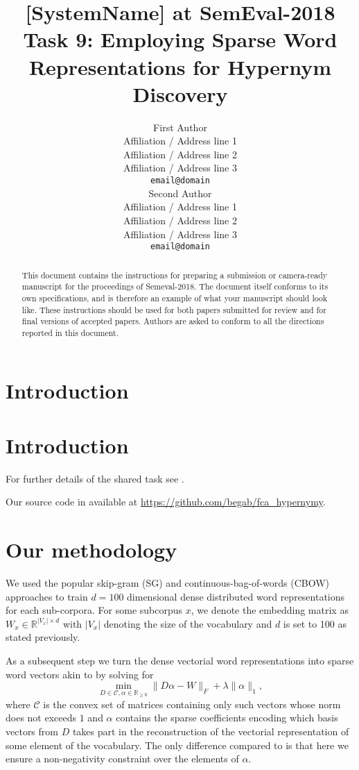 \documentclass[11pt,a4paper]{article}
\title{[SystemName] at SemEval-2018 Task 9: Employing Sparse Word Representations for Hypernym Discovery}
\author{First Author \\
  Affiliation / Address line 1 \\
  Affiliation / Address line 2 \\
  Affiliation / Address line 3 \\
  {\tt email@domain} \\\And
  Second Author \\
  Affiliation / Address line 1 \\
  Affiliation / Address line 2 \\
  Affiliation / Address line 3 \\
  {\tt email@domain} \\}
\date{}
\begin{document}
\maketitle
\begin{abstract}
  This document contains the instructions for preparing a submission or camera-ready
  manuscript for the proceedings of Semeval-2018. The document itself
  conforms to its own specifications, and is therefore an example of
  what your manuscript should look like. These instructions should be
  used for both papers submitted for review and for final versions of
  accepted papers.  Authors are asked to conform to all the directions
  reported in this document.
\end{abstract}

\section{Introduction}



\section{Introduction}


For further details of the shared task see
\cite{semeval2018task9}.

Our source code in available at \url{https://github.com/begab/fca_hypernymy}.


\section{Our methodology}
We used the popular skip-gram (SG) and continuous-bag-of-words (CBOW) approaches \cite{DBLP:journals/corr/abs-1301-3781} to train $d=100$ dimensional dense distributed word representations for each sub-corpora. For some subcorpus $x$, we denote the embedding matrix as $W_x \in \mathbb{R}^{\lvert V_x \rvert \times d}$ with $\lvert V_x \rvert$ denoting the size of the vocabulary and $d$ is set to 100 as stated previously.

As a subsequent step we turn the dense vectorial word representations into sparse word vectors akin to \citet{TACL1063} by solving for
\begin{equation}
\min\limits_{D \in \mathcal{C}, \alpha \in \mathbb{R}_{\geq0}} \lVert D\alpha - W \rVert_F + \lambda \lVert \alpha \rVert_1,
\label{nonneg_SPAMS_objective}
\end{equation}
where $\mathcal{C}$ is the convex set of matrices containing only such vectors whose norm does not exceeds $1$ and $\alpha$ contains the sparse coefficients encoding which basis vectors from $D$ takes part in the reconstruction of the vectorial representation of some element of the vocabulary. The only difference compared to \cite{TACL1063} is that here we ensure a non-negativity constraint over the elements of $\alpha$.
\end{document}
